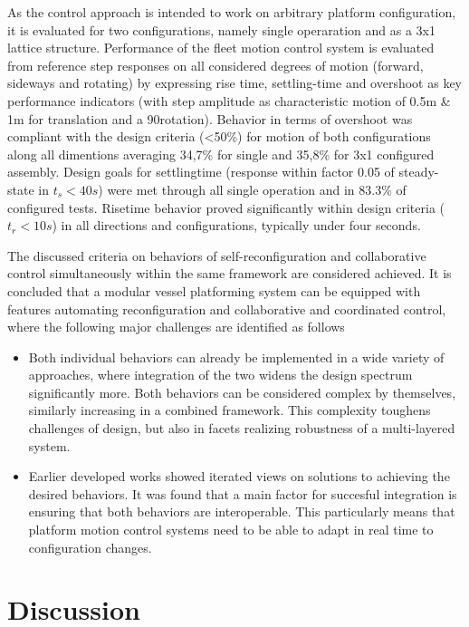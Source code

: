 As the control approach is intended to work on arbitrary platform configuration, it is evaluated for two configurations, namely single operaration and as a 3x1 lattice structure.  Performance of the fleet motion control system is evaluated from reference step responses on all considered degrees of motion (forward, sideways and rotating) by expressing rise time, settling-time and overshoot as key performance indicators (with step amplitude as characteristic motion of 0.5m \& 1m for translation and a 90\textdegree rotation). Behavior in terms of overshoot was compliant with the design criteria (<50\%) for motion of both configurations along all dimentions averaging 34,7\% for single and 35,8\% for 3x1 configured assembly. Design goals  for settlingtime (response within factor 0.05 of steady-state in $t_s<40s$) were met through all single operation and in 83.3\% of configured tests. Risetime behavior proved significantly within design criteria ($t_r<10s$) in all directions and configurations, typically under four seconds. 

The discussed criteria on behaviors of self-reconfiguration and collaborative control simultaneously within the same framework are considered achieved. It is concluded that a modular vessel platforming system can be equipped with features automating reconfiguration and collaborative and coordinated control, where the following major challenges are identified as follows
\begin{itemize}
	\item Both individual behaviors can already be implemented in a wide variety of approaches, where integration of the two widens the design spectrum significantly more. Both behaviors can be considered complex by themselves, similarly increasing in a combined framework. This complexity toughens challenges of design, but also in facets realizing robustness of a multi-layered system.
	\item Earlier developed works showed iterated views on solutions to achieving the desired behaviors. It was found that a main factor for succesful integration is ensuring that both behaviors are interoperable. This particularly means that platform motion control systems need to be able to adapt in real time to configuration changes. 
\end{itemize}

\section{Discussion}

